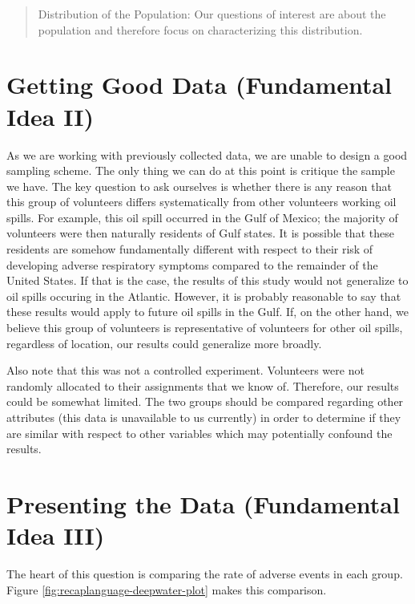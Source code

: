 \documentclass[
]{book}
\theoremstyle{plain}
\theoremstyle{mydefn}
\theoremstyle{myexmpl}
\theoremstyle{remark}
\begin{document}
\begin{quote}
Distribution of the Population: Our questions of interest are about the population and therefore focus on characterizing this distribution.
\end{quote}

\hypertarget{getting-good-data-fundamental-idea-ii}{%
\section{Getting Good Data (Fundamental Idea II)}\label{getting-good-data-fundamental-idea-ii}}

As we are working with previously collected data, we are unable to design a good sampling scheme. The only thing we can do at this point is critique the sample we have. The key question to ask ourselves is whether there is any reason that this group of volunteers differs systematically from other volunteers working oil spills. For example, this oil spill occurred in the Gulf of Mexico; the majority of volunteers were then naturally residents of Gulf states. It is possible that these residents are somehow fundamentally different with respect to their risk of developing adverse respiratory symptoms compared to the remainder of the United States. If that is the case, the results of this study would not generalize to oil spills occuring in the Atlantic. However, it is probably reasonable to say that these results would apply to future oil spills in the Gulf. If, on the other hand, we believe this group of volunteers is representative of volunteers for other oil spills, regardless of location, our results could generalize more broadly.

Also note that this was not a controlled experiment. Volunteers were not randomly allocated to their assignments that we know of. Therefore, our results could be somewhat limited. The two groups should be compared regarding other attributes (this data is unavailable to us currently) in order to determine if they are similar with respect to other variables which may potentially confound the results.

\hypertarget{presenting-the-data-fundamental-idea-iii}{%
\section{Presenting the Data (Fundamental Idea III)}\label{presenting-the-data-fundamental-idea-iii}}

The heart of this question is comparing the rate of adverse events in each group. Figure \ref{fig:recaplanguage-deepwater-plot} makes this comparison.
\end{document}
